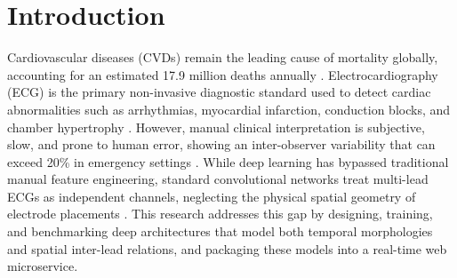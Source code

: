 \documentclass[12pt,a4paper]{report}
\begin{document}
\clearpage

\listoftables
{}
\clearpage

\listoffigures
{}
\clearpage

\tableofcontents
{}

\clearpage

\clearpage
{}
\setcounter{page}{1}

\chapter*{Introduction}
\label{ch:intro}

Cardiovascular diseases (CVDs) remain the leading cause of mortality globally, accounting for an estimated 17.9 million deaths annually \cite{whocvd}. Electrocardiography (ECG) is the primary non-invasive diagnostic standard used to detect cardiac abnormalities such as arrhythmias, myocardial infarction, conduction blocks, and chamber hypertrophy \cite{schlapfer2017ecg}. However, manual clinical interpretation is subjective, slow, and prone to human error, showing an inter-observer variability that can exceed 20\% in emergency settings \cite{hannun2019cardiologist}. While deep learning has bypassed traditional manual feature engineering, standard convolutional networks treat multi-lead ECGs as independent channels, neglecting the physical spatial geometry of electrode placements \cite{ribeiro2020automatic}. This research addresses this gap by designing, training, and benchmarking deep architectures that model both temporal morphologies and spatial inter-lead relations, and packaging these models into a real-time web microservice.
\end{document}

